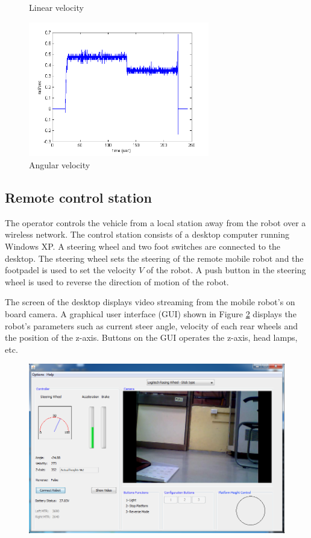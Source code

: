 \begin{figure}
\begin{minipage}[t]{0.5\textwidth}
	\caption{Linear velocity}\label{fig:cirVel}
\end{minipage}
\hfill
\begin{minipage}[t]{0.5\textwidth}
	\centering
	\includegraphics[width=3.1in]{Chapter5/fig/cirOmega} 
	\caption{Angular velocity}\label{fig:cirOmega}
\end{minipage}
\end{figure}

\subsection{ Remote control station}   
The operator controls the vehicle from a local station away from the robot over a wireless network. The control station consists of a desktop computer running Windows XP. A steering wheel and two foot switches are connected to the desktop. The steering wheel sets the steering of the remote mobile robot and the footpadel is used to set the velocity $V$ of the robot. A push button in the steering wheel is used to reverse the direction of motion of the robot.

The screen of the desktop displays  video streaming  from the mobile robot's on board camera. A graphical user  interface (GUI) shown in Figure \ref{fig:Gui} displays the robot's parameters such as current steer angle, velocity of each rear wheels and the position of the z-axis. Buttons on the GUI operates the z-axis, head lamps, etc.

\begin{figure}
	\includegraphics[width=\linewidth,keepaspectratio]{Chapter5/fig/gui}
	\label{fig:Gui} 
\end{figure}


